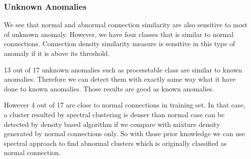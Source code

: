 \subsubsection{Unknown Anomalies}
We see that normal and abnormal connection similarity are also sensitive to most of unknown anomaly. 
However, we have four classes that is similar to normal connections. 
Connection density similarity measure is sensitive in this type of anomaly if it is above its threshold. 

13 out of 17 unknown anomalies such as processtable class are similar to known anomalies. 
Therefore we can detect them with exactly same way what it have done to known anomalies. 
Those results are good as known anomalies. 

\begin{table}[h]
\begin{center}
\end{center}
\caption{Unknown anomalies that is similar to known anomalies detection rate}
\label{fig:refSingleRobot1}
\end{table}

However 4 out of 17 are close to normal connections in training set. 
In that case, a cluster resulted by spectral clustering is denser than normal case can be detected by density based algorithm if we compare with mixture density generated by normal connections only. 
So with those prior knowledge we can use spectral approach to find abnormal clusters which is originally classified as normal connection. 

